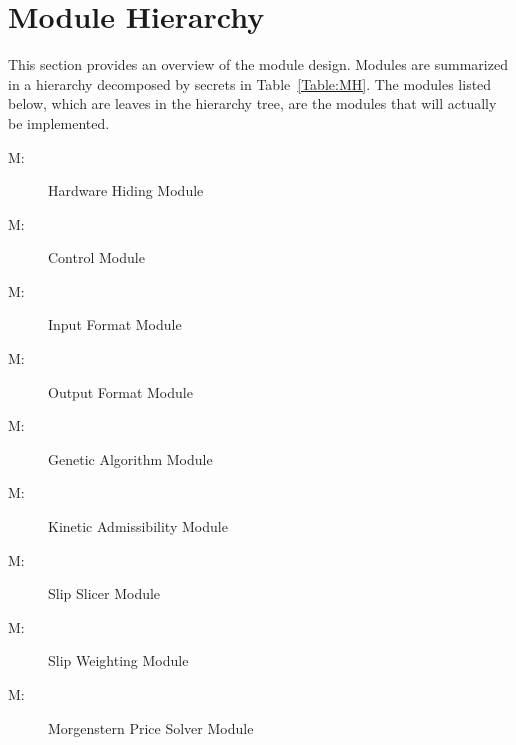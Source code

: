 \documentclass[12pt]{article}
\newcounter{modnum}
\newcommand{\mthemodnum}{M\themodnum}
\begin{document}
\section{Module Hierarchy}
\label{Sec:MH}
This section provides an overview of the module design. Modules are summarized in a hierarchy decomposed by secrets in Table~\ref{Table:MH}. The modules listed below, which are leaves in the hierarchy tree, are the modules that will actually be implemented.
\begin{description}
\item[\mthemodnum\label{MhwHiding}:]Hardware Hiding Module
\end{description}
\begin{description}
\item[\mthemodnum\label{MmodControl}:]Control Module
\end{description}
\begin{description}
\item[\mthemodnum\label{Mmodinputfdesc}:]Input Format Module
\end{description}
\begin{description}
\item[\mthemodnum\label{Mmodoutputfdesc}:]Output Format Module
\end{description}
\begin{description}
\item[\mthemodnum\label{Mmodgenalgdesc}:]Genetic Algorithm Module
\end{description}
\begin{description}
\item[\mthemodnum\label{Mmodkinadmdesc}:]Kinetic Admissibility Module
\end{description}
\begin{description}
\item[\mthemodnum\label{Mmodslipslicerdesc}:]Slip Slicer Module
\end{description}
\begin{description}
\item[\mthemodnum\label{Mmodslipweightdesc}:]Slip Weighting Module
\end{description}
\begin{description}
\item[\mthemodnum\label{Mmodmpdesc}:]Morgenstern Price Solver Module
\end{description}
\end{document}
